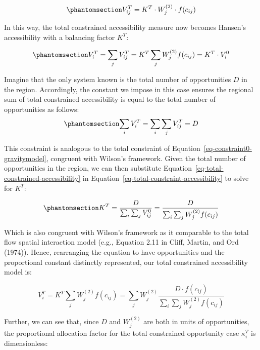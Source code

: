 \documentclass[
]{article}
\begin{document}
\begin{equation}\phantomsection\label{eq-total-constrained-access}{
V^T_{ij} = K^T \cdot W_j^{(2)} \cdot f(c_{ij})
}\end{equation}

In this way, the total constrained accessibility measure now becomes
Hansen's accessibility with a balancing factor \(K^T\):

\begin{equation}\phantomsection\label{eq-total-constrained-accessibility}{
V^T_i = \sum_j V^T_{ij} = K^T \sum_j W^{(2)}_jf(c_{ij}) = K^T \cdot V^0_i
}\end{equation}

Imagine that the only system known is the total number of opportunities
\(D\) in the region. Accordingly, the constant we impose in this case
ensures the regional sum of total constrained accessibility is equal to
the total number of opportunities as follows:
\begin{equation}\phantomsection\label{eq-total-constraint-accessibility}{
\sum_i V^T_{i} = \sum_i\sum_j V^T_{ij} = D
}\end{equation}

This constraint is analogous to the total constraint of
Equation~\ref{eq-constraint0-gravitymodel}, congruent with Wilson's
framework. Given the total number of opportunities in the region, we can
then substitute Equation~\ref{eq-total-constrained-accessibility} in
Equation~\ref{eq-total-constraint-accessibility} to solve for \(K^T\):

\begin{equation}\phantomsection\label{eq-total-opportunity-balancing-factor}{
K^T =\frac{D}{\sum_i\sum_j V^0_{ij}} = \frac{D}{\sum_i\sum_j W^{(2)}_jf(c_{ij})}
}\end{equation}

Which is also congruent with Wilson's framework as it comparable to the
total flow spatial interaction model (e.g., Equation 2.11 in Cliff,
Martin, and Ord (1974)). Hence, rearranging the equation to have
opportunities and the proportional constant distinctly represented, our
total constrained accessibility model is:

\[
V^T_i = K^T\sum_j W^{(2)}_jf(c_{ij}) = \sum_j W^{(2)}_j\frac{D\cdot f(c_{ij})}{\sum_i\sum_j W^{(2)}_jf(c_{ij})}
\]

Further, we can see that, since \(D\) and \(W^{(2)}_j\) are both in
units of opportunities, the proportional allocation factor for the total
constrained opportunity case \(\kappa_i^T\) is dimensionless:
\end{document}
